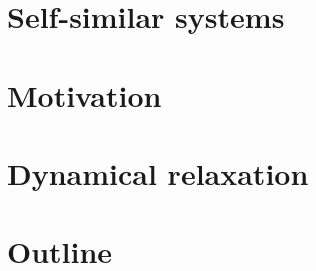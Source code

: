 \section{Self-similar systems}
\cite{2015LauNagaietal}

\section{Motivation}

\section{Dynamical relaxation}

\section{Outline}
